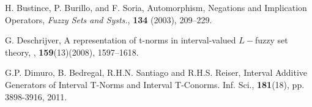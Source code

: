 \documentclass[12pt]{article}
\theoremstyle{plain}
\theoremstyle{remark}
\theoremstyle{definition}
\theoremstyle{proposition}
\begin{document}
\begin{thebibliography}{8}
{%

 H. Bustince, P. Burillo, and F. Soria, Automorphism, Negations and Implication Operators,
{\it Fuzzy Sets and Systs.}, \textbf{134} (2003),
209--229.


%
%

%
 G. Deschrijver, A representation of t-norms in interval-valued $L-$fuzzy set theory,
, \textbf{159}(13)(2008), 1597--1618.

G.P. Dimuro, B. Bedregal, R.H.N. Santiago and R.H.S. Reiser,
Interval Additive  Generators of Interval T-Norms and Interval T-Conorms.
Inf. Sci., \textbf{181}(18), pp. 3898-3916, 2011.




%
%
%

}
\end{thebibliography}
\end{document}
